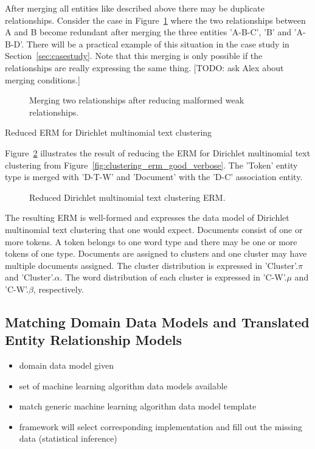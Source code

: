 After merging all entities like described above there may be duplicate relationships. Consider the case in Figure~\ref{fig:erm_reduction_minimal_example} where the two relationships between A and B become redundant after merging the three entities 'A-B-C', 'B' and 'A-B-D'. There will be a practical example of this situation in the case study in Section~\ref{sec:casestudy}. Note that this merging is only possible if the relationships are really expressing the same thing. [TODO: ask Alex about merging conditions.]

\begin{figure}[t]
\centering
\scalebox{\tikzScale}{\adjustTikzSize }
\caption{Merging two relationships after reducing malformed weak relationships.}\label{fig:erm_reduction_minimal_example}
\end{figure}

\begin{Example}{Reduced ERM for Dirichlet multinomial text clustering}

Figure~\ref{fig:clustering_erm_good_reduced} illustrates the result of reducing the ERM for Dirichlet multinomial text clustering from Figure~\ref{fig:clustering_erm_good_verbose}. The 'Token' entity type is merged with 'D-T-W' and 'Document' with the 'D-C' association entity.

\begin{figure}[h]
\centering
\scalebox{\tikzScale}{\adjustTikzSize }
\caption{Reduced Dirichlet multinomial text clustering ERM.}\label{fig:clustering_erm_good_reduced}
\end{figure}

The resulting ERM is well-formed and expresses the data model of Dirichlet multinomial text clustering that one would expect. Documents consist of one or more tokens. A token belongs to one word type and there may be one or more tokens of one type. Documents are assigned to clusters and one cluster may have multiple documents assigned. The cluster distribution is expressed in 'Cluster'.$\pi$ and 'Cluster'.$\alpha$. The word distribution of each cluster is expressed in 'C-W'.$\mu$ and 'C-W'.$\beta$, respectively.

\end{Example}

\subsection{Matching Domain Data Models and Translated Entity Relationship Models}

\begin{itemize}
\item domain data model given
\item set of machine learning algorithm data models available
\item match generic machine learning algorithm data model template
\item framework will select corresponding implementation and fill out the missing data (statistical inference)
\end{itemize}
